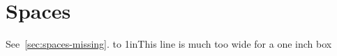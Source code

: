 \section{Spaces}
See~\ref{sec:spaces-missing}.
\hbox to 1in{This line is much too wide for a one inch box}
